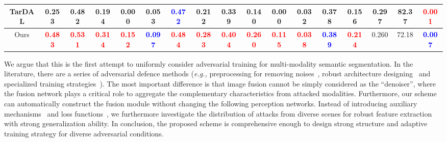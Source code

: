 \documentclass[sigconf]{acmart}
\begin{document}
\begin{table*}[htb]
{\begin{tabular}{c|ccccccc|cccccc|ccc}
			TarDAL	 & \multicolumn{1}{c|}{0.253} & \multicolumn{1}{c|}{0.482}  & \multicolumn{1}{c|}{0.194}   & \multicolumn{1}{c|}{0.000}   & \multicolumn{1}{c|}{0.053} & \multicolumn{1}{c|}{\textcolor{blue}{\textbf{0.472}}} & 0.212  & \multicolumn{1}{c|}{0.339} & \multicolumn{1}{c|}{0.140} & \multicolumn{1}{c|}{0.000} & \multicolumn{1}{c|}{0.032}  & \multicolumn{1}{c|}{0.378} & \multicolumn{1}{c|}{0.156} & \multicolumn{1}{c|}{0.297}& \multicolumn{1}{c|}{82.37}& \multicolumn{1}{c}{\textcolor{red}{\textbf{0.001}}} \\ \hline
			Ours	 & \multicolumn{1}{c|}{\textcolor{red}{\textbf{0.483}}} & \multicolumn{1}{c|}{\textcolor{red}{\textbf{0.531}}}  & \multicolumn{1}{c|}{\textcolor{red}{\textbf{0.314}}}   & \multicolumn{1}{c|}{\textcolor{red}{\textbf{0.152}}}   & \multicolumn{1}{c|}{\textcolor{blue}{\textbf{0.097}}} & \multicolumn{1}{c|}{\textcolor{red}{\textbf{0.484}}} & \textcolor{red}{\textbf{0.283}}  & \multicolumn{1}{c|}{\textcolor{red}{\textbf{0.404}}} & \multicolumn{1}{c|}{\textcolor{red}{\textbf{0.260}}} & \multicolumn{1}{c|}{\textcolor{red}{\textbf{0.115}}} & \multicolumn{1}{c|}{\textcolor{red}{\textbf{0.038}}}  & \multicolumn{1}{c|}{\textcolor{blue}{\textbf{0.389}}} & \multicolumn{1}{c|}{\textcolor{red}{\textbf{0.214}}} & \multicolumn{1}{c|}{0.260} & \multicolumn{1}{c|}{72.18}& \multicolumn{1}{c}{\textcolor{blue}{\textbf{0.007}}} \\ \hline
			
	\end{tabular}}
	
\end{table*}


We argue that this is the first attempt to uniformly consider adversarial training for multi-modality semantic segmentation. In the literature, there are a series of adversarial defence methods (\textit{e.g.,} preprocessing for removing noises~\cite{liao2018defense,xie2019feature},  robust architecture designing~\cite{mao2022towards,guo2020meets} and specialized training strategies~\cite{xie2019improving}). 
The most important difference is that image fusion cannot be simply considered as the ``denoiser'', where the fusion network plays a critical role to aggregate 
the complementary characteristics from attacked modalities. 
Furthermore, our scheme can automatically construct the fusion module without changing the following perception networks. 
Instead of introducing auxiliary mechanisms~\cite{xie2019improving} and loss functions~\cite{chen2021class},  we furthermore investigate the distribution of attacks from diverse scenes for robust feature extraction with strong generalization ability. 
In conclusion, the proposed scheme is comprehensive enough to design strong structure and adaptive training strategy for diverse adversarial conditions.
\end{document}

